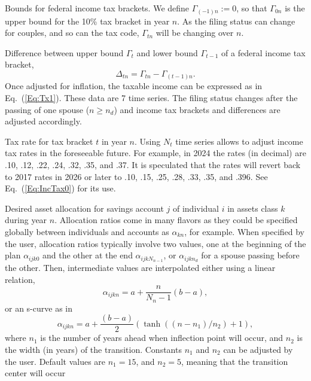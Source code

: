 \documentclass{report}[fleqn,11pt]
\begin{document}
\begin{description}[leftmargin=4em,style=multiline]
\item [$\Gamma_{tn}$]
	Bounds for federal income tax brackets. We define $\Gamma_{(-1)n} := 0$, so that
	$\Gamma_{0n}$ is the upper bound for the 10\% tax bracket in year $n$. As the filing status
	can change for couples, and so can the tax code, $\Gamma_{tn}$ will be changing over $n$.
\item [$\Delta_{tn}$]
	Difference between upper bound $\Gamma_t$ and lower bound $\Gamma_{t-1}$
	of a federal income tax bracket,
	\begin{equation}
		\Delta_{tn} = \Gamma_{tn} - \Gamma_{(t-1)n}.
	\end{equation}
	Once adjusted for inflation,
	the taxable income can be expressed as in Eq.~(\ref{Eq:Tx1}). These data are 7 time series.
	The filing status changes after the passing of one spouse ($n \ge n_d$) and income tax
	brackets and differences are adjusted accordingly.
\item [$\theta_{tn}$]
	Tax rate for tax bracket $t$ in year $n$. Using $N_t$ time series allows to adjust income
	tax rates in the foreseeable future.
	For example, in 2024 the rates (in decimal) are .10, .12, .22, .24, .32, .35, and .37.
	It is speculated that the rates will revert back to 2017 rates in 2026 or later to
	.10, .15, .25, .28, .33, .35, and .396. See Eq.~(\ref{Eq:IncTax0}) for its use.
\item [$\alpha_{ijkn}$]
	Desired asset allocation for savings account $j$ of individual $i$ in
	assets class $k$ during year $n$.
	Allocation ratios come in many flavors as they could be specified globally between
	individuals and accounts as $\alpha_{kn}$, for example.
	When specified by the user, allocation ratios typically involve two values, one at the
	beginning of the plan $\alpha_{ijk0}$ and the other at the end
	$\alpha_{ijkN_{n-1}}$, or $\alpha_{ijkn_d}$ for a spouse passing before the other.
        Then, intermediate values are interpolated either using
	a linear relation,
\begin{equation}
	\alpha_{ijkn} = a + \frac{n}{N_n - 1} (b - a),
\end{equation}
or an s-curve as in
\begin{equation}
	\alpha_{ijkn} = a + \frac{(b - a)}{2}
	(\tanh((n-n_1)/n_2) + 1),
\end{equation}
	where $n_1$ is the number of years ahead when inflection point will occur, and $n_2$ is the
	width (in years) of the transition. Constants $n_1$ and $n_2$ can be adjusted by the user.
	Default values are $n_1 = 15$, and $n_2 = 5$, meaning that the transition center will occur

\end{description}
\end{document}
